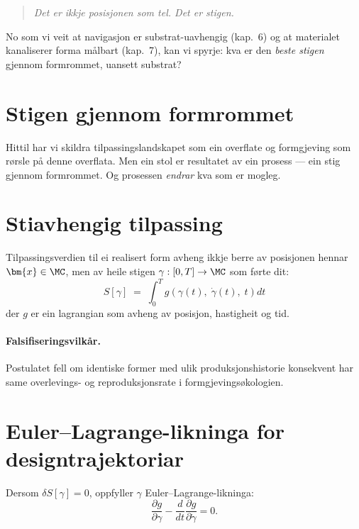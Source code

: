 \begin{quote}
\itshape
Det er ikkje posisjonen som tel. Det er stigen.
\end{quote}

No som vi veit at navigasjon er substrat-uavhengig (kap.~6) og at
materialet kanaliserer forma målbart (kap.~7), kan vi spyrje: kva
er den \emph{beste stigen} gjennom formrommet, uansett substrat?


\section{Stigen gjennom formrommet}

Hittil har vi skildra tilpassingslandskapet som ein overflate og
formgjeving som rørsle på denne overflata. Men ein stol er
resultatet av ein prosess --- ein stig gjennom formrommet. Og
prosessen \emph{endrar} kva som er mogleg.


\section{Stiavhengig tilpassing}

\begin{postmark}\label{post:L.8.1}
Tilpassingsverdien til ei realisert form avheng ikkje berre av
posisjonen hennar $\bm{x} \in \MC$, men av heile stigen
$\gamma : [0, T] \to \MC$ som førte dit:
\[
  S[\gamma] \;=\; \int_0^T
    g\!\left(\gamma(t),\; \dot{\gamma}(t),\; t\right) dt
\]
der $g$ er ein lagrangian som avheng av posisjon, hastigheit og tid.
\end{postmark}

\paragraph{Falsifiseringsvilkår.}
Postulatet fell om identiske former med ulik produksjonshistorie
konsekvent har same overlevings- og reproduksjonsrate i
formgjevingsøkologien.


\section{Euler--Lagrange-likninga for designtrajektoriar}

\begin{satmark}\label{thm:L.8.2}
Dersom $\delta S[\gamma] = 0$, oppfyller $\gamma$ Euler--Lagrange-likninga:
\[
  \frac{\partial g}{\partial \gamma}
  - \frac{d}{dt}\frac{\partial g}{\partial \dot{\gamma}} = 0.
\]
\end{satmark}

